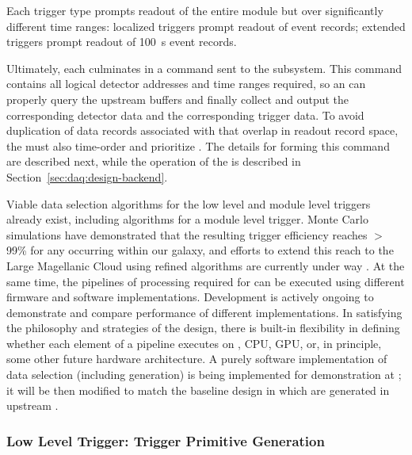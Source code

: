 \noindent Each trigger type prompts readout
of the entire module but over significantly different time
ranges: localized triggers prompt readout of \spreadout event records; extended
triggers prompt readout of \SI{100}{\second} event records. 

Ultimately, each  culminates in a command sent to
the  subsystem. 
This command contains all logical detector addresses and time ranges
required, so an  can properly query the upstream 
buffers and finally collect and output the corresponding detector data
and the corresponding trigger data. To avoid duplication of data
records associated with  that overlap in readout
record space, the  must also time-order and
prioritize . The details for forming this
command are described next, while the operation of the  is
described in Section~\ref{sec:daq:design-backend}.

Viable data selection algorithms for the low level and module level triggers already exist, including
algorithms for a module level  trigger.  Monte Carlo simulations have demonstrated that the resulting
 trigger efficiency reaches $>$99\% for any 
occurring within our galaxy, and efforts to extend this reach to the
Large Magellanic Cloud using refined algorithms are currently under way \cite{bib:docdb11215,bib:docdb14522}. At the same time, the
pipelines of processing required 
for  can be executed using different firmware and software
implementations. Development is actively ongoing to demonstrate
and compare performance of different implementations. In satisfying
the philosophy and strategies of the  design, there is built-in
flexibility in defining whether each element of a pipeline executes on
, CPU, GPU, or, in principle, some other future hardware
architecture. A purely software implementation of data selection
(including  generation) is being
implemented for demonstration at ; it will be then
modified to match the baseline design in which  are
generated in upstream  .


\subsubsection{Low Level Trigger: Trigger Primitive Generation}
\label{sec:daq:design-trigger-primitives}

